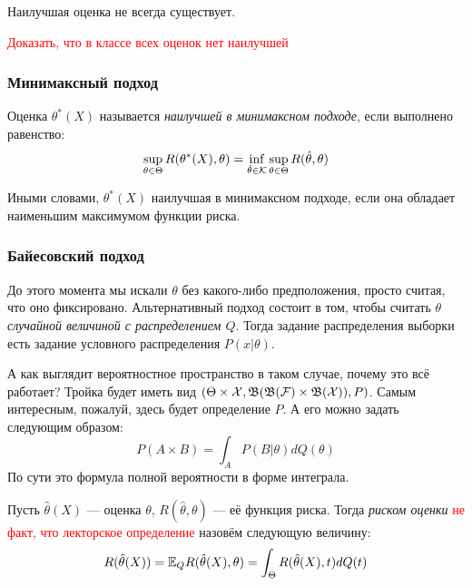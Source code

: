 \begin{note}
	Наилучшая оценка не всегда существует.
\end{note}

\textcolor{red}{Доказать, что в классе всех оценок нет наилучшей}

\subsubsection{Минимаксный подход}

\begin{definition}
	Оценка $\theta^*(X)$ называется \textit{наилучшей в минимаксном подходе}, если выполнено равенство:
	\[
		\sup_{\theta \in \Theta} R(\theta^*(X), \theta) = \inf_{\hat{\theta} \in \mathcal{K}} \sup_{\theta \in \Theta} R(\hat{\theta}, \theta)
	\]
\end{definition}

\begin{note}
	Иными словами, $\theta^*(X)$ наилучшая в минимаксном подходе, если она обладает наименьшим максимумом функции риска.
\end{note}

\subsubsection{Байесовский подход}

\begin{note}
	До этого момента мы искали $\theta$ без какого-либо предположения, просто считая, что оно фиксировано. Альтернативный подход состоит в том, чтобы считать $\theta$ \textit{случайной величиной с распределением $Q$}. Тогда задание распределения выборки есть задание условного распределения $P(x|\theta)$.
\end{note}

\begin{anote}
	А как выглядит вероятностное пространство в таком случае, почему это всё работает? Тройка будет иметь вид $(\Theta \times \mathcal{X}, \mathfrak{B}(\mathfrak{B}(\mathcal{F})\times \mathfrak{B}(\mathcal{X})), P)$. Самым интересным, пожалуй, здесь будет определение $P$. А его можно задать следующим образом:
	\[
		P(A \times B) = \int_A P(B | \theta)dQ(\theta)
	\]
	По сути это формула полной вероятности в форме интеграла.
\end{anote}

\begin{definition}
	Пусть $\hat{\theta}(X)$ --- оценка $\theta$, $R(\hat{\theta}, \theta)$ --- её функция риска. Тогда \textit{риском оценки} \textcolor{red}{не факт, что лекторское определение} назовём следующую величину:
	\[
		R(\hat{\theta}(X)) = \mathbb{E}_Q R(\hat{\theta}(X), \theta) = \int_\Theta R(\hat{\theta}(X), t) dQ(t)
	\]
\end{definition}

